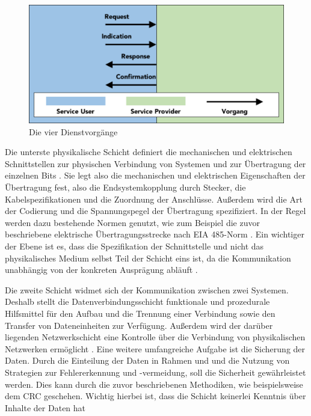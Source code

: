 \begin{figure}
\centering
\includegraphics[width=\textwidth]{abbildungen/20160310_vorgang}
\caption{Die vier Dienstvorgänge}
\label{fig:vorgang}
\end{figure}

Die unterste physikalische Schicht definiert die mechanischen und elektrischen Schnittstellen zur physischen Verbindung von Systemen und zur Übertragung der einzelnen Bits \cite[S.~49f.]{osi96}. Sie legt also die mechanischen und elektrischen Eigenschaften der Übertragung fest, also die Endsystemkopplung durch Stecker, die Kabelspezifikationen und die Zuordnung der Anschlüsse. Außerdem wird die Art der Codierung und die Spannungspegel der Übertragung spezifiziert. In der Regel werden dazu bestehende Normen genutzt, wie zum Beispiel die zuvor beschriebene elektrische Übertragungsstrecke nach EIA 485-Norm \cite[S.~14f.]{schn06}.
Ein wichtiger der Ebene ist es, dass die Spezifikation der Schnittstelle und nicht das physikalisches Medium selbst Teil der Schicht eins ist, da die Kommunikation unabhängig von der konkreten Ausprägung abläuft \cite[S.~9]{schn06}.

Die zweite Schicht widmet sich der Kommunikation zwischen zwei Systemen. Deshalb stellt die Datenverbindungsschicht funktionale und prozedurale Hilfsmittel für den Aufbau und die Trennung einer Verbindung sowie den Transfer von Dateneinheiten zur Verfügung. Außerdem  wird der darüber liegenden Netzwerkschicht eine Kontrolle über die Verbindung von physikalischen Netzwerken ermöglicht \cite[S.~46f.]{osi96}.
Eine weitere umfangreiche Aufgabe ist die Sicherung der Daten. Durch die Einteilung der Daten in Rahmen und und die Nutzung von Strategien zur Fehlererkennung und -vermeidung, soll die Sicherheit gewährleistet werden. Dies kann durch die zuvor beschriebenen Methodiken, wie beispielsweise dem CRC geschehen. Wichtig hierbei ist, dass die Schicht keinerlei Kenntnis über Inhalte der Daten hat \cite[S.~9ff.]{schn06}

